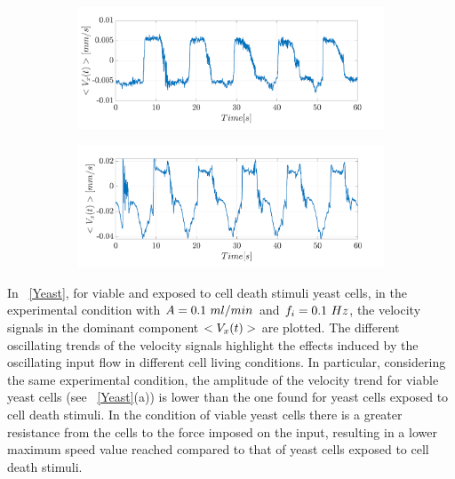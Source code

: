 \documentclass[journal]{IEEEtran}
\theoremstyle{definition}
\theoremstyle{remark}
\begin{document}
\begin{figure}[t]
	\centering
	\begin{subfigure}[b]{\columnwidth}
		\centering
		\includegraphics[width=1\columnwidth]{images/YeastA}
		\caption{}
		\label{A}
	\end{subfigure}
	\begin{subfigure}[b]{\columnwidth}
		\centering
		\includegraphics[width=1\columnwidth]{images/YeastB}
		\caption{}
		\label{B}
	\end{subfigure}
\end{figure}  

In ~\fig\ref{Yeast}, for viable and exposed to cell death stimuli yeast cells, in the experimental condition with $A=0.1~ml/min$ and  $f_i=0.1~Hz$, the velocity signals in the dominant component  $<V_{x}(t)>$ are plotted. The different oscillating trends of the velocity signals highlight the effects induced by the oscillating input flow in different cell living conditions. In particular, considering the same experimental condition, the amplitude of the velocity trend for viable yeast cells (see ~\fig\ref{Yeast}(a)) is lower than the one found for yeast cells exposed to cell death stimuli. 
In the condition of viable yeast cells there is a greater resistance from the cells to the force imposed on the input, resulting in a lower maximum speed value reached compared to that of yeast cells exposed to cell death stimuli.
\end{document}
